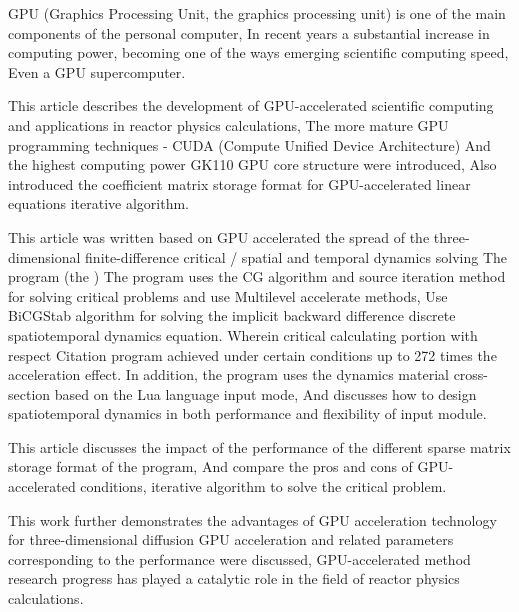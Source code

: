 
\begin{eabstract}
GPU (Graphics Processing Unit, the graphics processing unit) is one of the main components of the personal computer,
In recent years a substantial increase in computing power, becoming one of the ways emerging scientific computing speed,
Even a GPU supercomputer.

This article describes the development of GPU-accelerated scientific computing and applications in reactor physics calculations,
The more mature GPU programming techniques - CUDA (Compute Unified Device Architecture)
And the highest computing power GK110 GPU core structure were introduced,
Also introduced the coefficient matrix storage format for GPU-accelerated linear equations iterative algorithm.

This article was written based on GPU accelerated the spread of the three-dimensional finite-difference critical / spatial and temporal dynamics solving
The program \ProgramName (the \ProgramFullName)
The program uses the CG algorithm and source iteration method for solving critical problems and use Multilevel accelerate methods,
Use BiCGStab algorithm for solving the implicit backward difference discrete spatiotemporal dynamics equation.
Wherein critical calculating portion with respect Citation program achieved under certain conditions up to 272 times the acceleration effect.
In addition, the \ProgramName program uses the dynamics material cross-section based on the Lua language input mode,
And discusses how to design spatiotemporal dynamics in both performance and flexibility of input module.

This article discusses the impact of the performance of the different sparse matrix storage format of the program,
And compare the pros and cons of GPU-accelerated conditions, iterative algorithm to solve the critical problem.

This work further demonstrates the advantages of GPU acceleration technology for three-dimensional diffusion
GPU acceleration and related parameters corresponding to the performance were discussed,
GPU-accelerated method research progress has played a catalytic role in the field of reactor physics calculations.
\end{eabstract}

